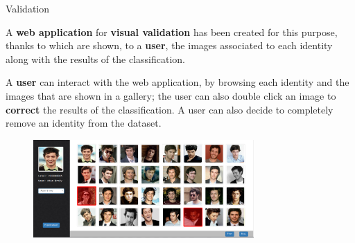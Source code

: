 \begin{tframe}{Validation}

A \textbf{web application} for \textbf{visual validation} has been created for this purpose, thanks to which are shown, to a \textbf{user}, the images associated to each identity along with the results of the classification.

\vspace{0.1in}

A \textbf{user} can interact with the web application, by browsing each identity and the images that are shown in a gallery; the user can also double click an image to \textbf{correct} the results of the classification. A user can also decide to completely remove an identity from the dataset.

\begin{figure}[h]
\begin{center}
\includegraphics[width=0.75\textwidth]{images/image5.png}
\end{center}
\end{figure}

\end{tframe}